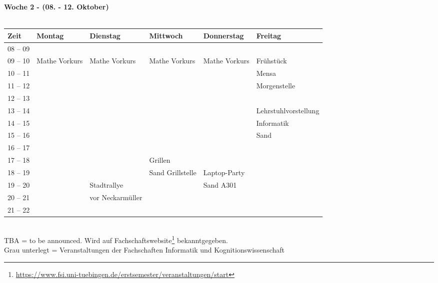 \textbf{Woche 2 - (08. - 12. Oktober)}\\
\\
\begin{tabular}{|l|p{}|p{}|p{}|p{}|p{}|} \hline
 Zeit & Montag & Dienstag & Mittwoch & Donnerstag & Freitag \\ \hline \hline
 08 -- 09 & & & & & \\ \hline
 09 -- 10 & \footnotesize{Mathe Vorkurs} & \footnotesize{Mathe Vorkurs} & \footnotesize{Mathe Vorkurs} & \footnotesize{Mathe Vorkurs} & \cellcolor{lightlightgray}\footnotesize{Frühstück} \\ \cline{1-1}
 10 -- 11 & & & & & \cellcolor{lightlightgray} \scriptsize{Mensa}\\ \cline{1-1}
 11 -- 12 & & & & & \cellcolor{lightlightgray} \scriptsize{Morgenstelle} \\ \cline{1-1}\cline{6-6}
 12 -- 13 & & & & & \\ \cline{1-1}\cline{6-6}
 13 -- 14 & & & & & \cellcolor{lightlightgray} \scriptsize{Lehrstuhlvorstellung} \\ \cline{1-1}
 14 -- 15 & & & & & \cellcolor{lightlightgray} \scriptsize{Informatik} \\ \cline{1-1}
 15 -- 16 & & & & & \cellcolor{lightlightgray} \scriptsize{Sand} \\ \cline{1-5}
 16 -- 17 & & & & & \cellcolor{lightlightgray} \scriptsize{}\\ \cline{1-1}\cline{4-4} \cline{6-6}
 17 -- 18 & & & \cellcolor{lightlightgray} \footnotesize{Grillen} & & \\ \cline{1-1} \cline{5-5}
 18 -- 19 & & & \cellcolor{lightlightgray} \scriptsize{Sand Grillstelle} & \cellcolor{lightlightgray} \footnotesize{Laptop-Party}& \\ \cline{1-1} \cline{3-3}
 19 -- 20 & & \cellcolor{lightlightgray} \footnotesize{Stadtrallye} & \cellcolor{lightlightgray} & \cellcolor{lightlightgray} \scriptsize{Sand A301} & \\ \cline{1-1}
 20 -- 21 & & \cellcolor{lightlightgray} \scriptsize{vor Neckarmüller} & \cellcolor{lightlightgray} & \cellcolor{lightlightgray} & \\ \cline{1-1}
 21 -- 22 & & \cellcolor{lightlightgray} & \cellcolor{lightlightgray} & \cellcolor{lightlightgray} & \\ \hline
\end{tabular}
\\
\scriptsize{TBA = to be announced. Wird auf Fachschaftswebsite\footnote{\url{https://www.fsi.uni-tuebingen.de/erstsemester/veranstaltungen/start}}  bekanntgegeben.} \\
\scriptsize{Grau unterlegt = Veranstaltungen der Fachschaften Informatik und Kognitionswissenschaft }
\newpage
\normalsize